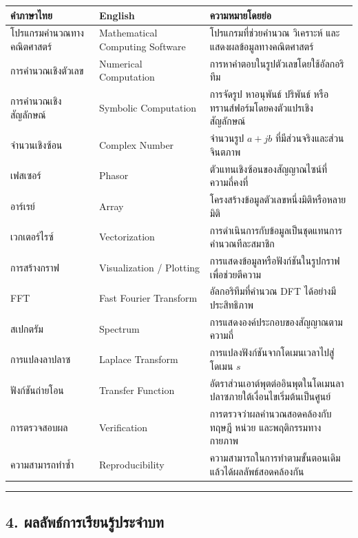 \begin{table}[htbp]
    \centering
    \begin{tabular}{l l l}
        \hline
        \textbf{คำภาษาไทย} & \textbf{English} & \textbf{ความหมายโดยย่อ} \\
        \hline
        โปรแกรมคำนวณทางคณิตศาสตร์ & Mathematical Computing Software & โปรแกรมที่ช่วยคำนวณ วิเคราะห์ และแสดงผลข้อมูลทางคณิตศาสตร์ \\
        การคำนวณเชิงตัวเลข & Numerical Computation & การหาคำตอบในรูปตัวเลขโดยใช้อัลกอริทึม \\
        การคำนวณเชิงสัญลักษณ์ & Symbolic Computation & การจัดรูป หาอนุพันธ์ ปริพันธ์ หรือทรานส์ฟอร์มโดยคงตัวแปรเชิงสัญลักษณ์ \\
        จำนวนเชิงซ้อน & Complex Number & จำนวนรูป $a+jb$ ที่มีส่วนจริงและส่วนจินตภาพ \\
        เฟสเซอร์ & Phasor & ตัวแทนเชิงซ้อนของสัญญาณไซน์ที่ความถี่คงที่ \\
        อาร์เรย์ & Array & โครงสร้างข้อมูลตัวเลขหนึ่งมิติหรือหลายมิติ \\
        เวกเตอร์ไรซ์ & Vectorization & การดำเนินการกับข้อมูลเป็นชุดแทนการคำนวณทีละสมาชิก \\
        การสร้างกราฟ & Visualization / Plotting & การแสดงข้อมูลหรือฟังก์ชันในรูปกราฟเพื่อช่วยตีความ \\
        FFT & Fast Fourier Transform & อัลกอริทึมที่คำนวณ DFT ได้อย่างมีประสิทธิภาพ \\
        สเปกตรัม & Spectrum & การแสดงองค์ประกอบของสัญญาณตามความถี่ \\
        การแปลงลาปลาซ & Laplace Transform & การแปลงฟังก์ชันจากโดเมนเวลาไปสู่โดเมน $s$ \\
        ฟังก์ชันถ่ายโอน & Transfer Function & อัตราส่วนเอาต์พุตต่ออินพุตในโดเมนลาปลาซภายใต้เงื่อนไขเริ่มต้นเป็นศูนย์ \\
        การตรวจสอบผล & Verification & การตรวจว่าผลคำนวณสอดคล้องกับทฤษฎี หน่วย และพฤติกรรมทางกายภาพ \\
        ความสามารถทำซ้ำ & Reproducibility & ความสามารถในการทำตามขั้นตอนเดิมแล้วได้ผลลัพธ์สอดคล้องกัน \\
        \hline
    \end{tabular}
\end{table}

\par\noindent\rule{\textwidth}{0.4pt}\par

\subsection{4. ผลลัพธ์การเรียนรู้ประจำบท}

